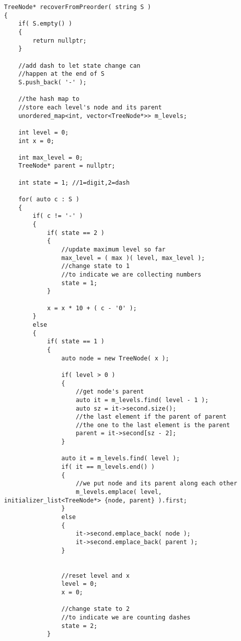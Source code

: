\setcounter{lstlisting}{0}
\begin{lstlisting}[style=customc, caption={Hash Map}]
TreeNode* recoverFromPreorder( string S )
{
    if( S.empty() )
    {
        return nullptr;
    }

    //add dash to let state change can
    //happen at the end of S
    S.push_back( '-' );

    //the hash map to
    //store each level's node and its parent
    unordered_map<int, vector<TreeNode*>> m_levels;

    int level = 0;
    int x = 0;

    int max_level = 0;
    TreeNode* parent = nullptr;

    int state = 1; //1=digit,2=dash

    for( auto c : S )
    {
        if( c != '-' )
        {
            if( state == 2 )
            {
                //update maximum level so far
                max_level = ( max )( level, max_level );
                //change state to 1
                //to indicate we are collecting numbers
                state = 1;
            }

            x = x * 10 + ( c - '0' );
        }
        else
        {
            if( state == 1 )
            {
                auto node = new TreeNode( x );

                if( level > 0 )
                {
                    //get node's parent
                    auto it = m_levels.find( level - 1 );
                    auto sz = it->second.size();
                    //the last element if the parent of parent
                    //the one to the last element is the parent
                    parent = it->second[sz - 2];
                }

                auto it = m_levels.find( level );
                if( it == m_levels.end() )
                {
                    //we put node and its parent along each other
                    m_levels.emplace( level, initializer_list<TreeNode*> {node, parent} ).first;
                }
                else
                {
                    it->second.emplace_back( node );
                    it->second.emplace_back( parent );
                }


                //reset level and x
                level = 0;
                x = 0;

                //change state to 2
                //to indicate we are counting dashes
                state = 2;
            }


\end{lstlisting}
